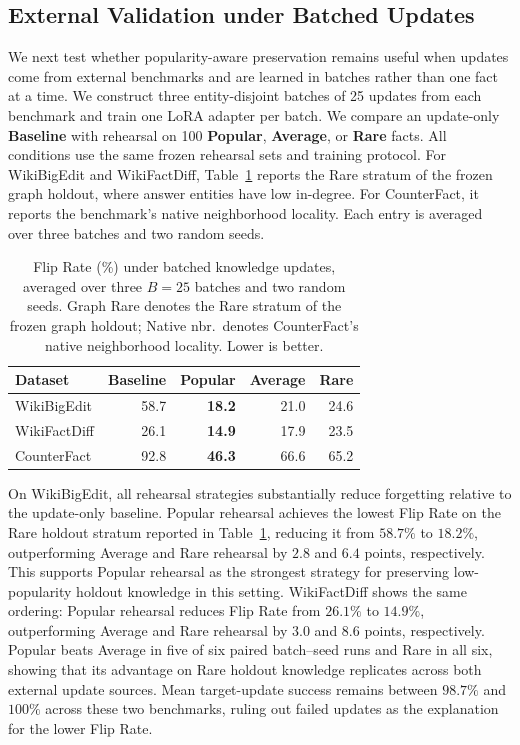 \FloatBarrier

\subsection{External Validation under Batched Updates}
\label{subsec:external_batched_validation}

We next test whether popularity-aware preservation remains useful when
updates come from external benchmarks and are learned in batches rather
than one fact at a time.  We construct three entity-disjoint batches of
25 updates from each benchmark and train one LoRA adapter per batch.  We
compare an update-only \textbf{Baseline} with rehearsal on 100
\textbf{Popular}, \textbf{Average}, or \textbf{Rare} facts.  All
conditions use the same frozen rehearsal sets and training protocol.
For WikiBigEdit and WikiFactDiff, Table~\ref{tab:external_batched}
reports the Rare stratum of the frozen graph holdout, where answer
entities have low in-degree.  For CounterFact, it reports the
benchmark's native neighborhood locality.  Each entry is averaged over
three batches and two random seeds.

\begin{table}[t]
\centering
\small
\setlength{\tabcolsep}{5.5pt}
\begin{tabular}{lrrrr}
\toprule
\textbf{Dataset} & \textbf{Baseline} & \textbf{Popular} &
\textbf{Average} & \textbf{Rare} \\
\midrule
WikiBigEdit  & 58.7 & \textbf{18.2} & 21.0 & 24.6 \\
WikiFactDiff & 26.1 & \textbf{14.9} & 17.9 & 23.5 \\
CounterFact  & 92.8 & \textbf{46.3} & 66.6 & 65.2 \\
\bottomrule
\end{tabular}
\caption{Flip Rate (\%) under batched knowledge updates, averaged over
three $B{=}25$ batches and two random seeds.  Graph Rare denotes the
Rare stratum of the frozen graph holdout; Native nbr.\ denotes
CounterFact's native neighborhood locality.  Lower is better.}
\label{tab:external_batched}
\end{table}

On WikiBigEdit, all rehearsal strategies substantially reduce
forgetting relative to the update-only baseline.  Popular rehearsal
achieves the lowest Flip Rate on the Rare holdout stratum reported in
Table~\ref{tab:external_batched}, reducing it from $58.7\%$ to $18.2\%$,
outperforming Average and Rare rehearsal by $2.8$ and $6.4$ points,
respectively.  This supports Popular rehearsal as the strongest
strategy for preserving low-popularity holdout knowledge in this
setting.  WikiFactDiff shows the same ordering: Popular rehearsal
reduces Flip Rate from $26.1\%$ to $14.9\%$, outperforming Average and
Rare rehearsal by $3.0$ and $8.6$ points, respectively.  Popular beats
Average in five of six paired batch--seed runs and Rare in all six,
showing that its advantage on Rare holdout knowledge replicates across
both external update sources.  Mean target-update success remains
between $98.7\%$ and $100\%$ across these two benchmarks, ruling out
failed updates as the explanation for the lower Flip Rate.

